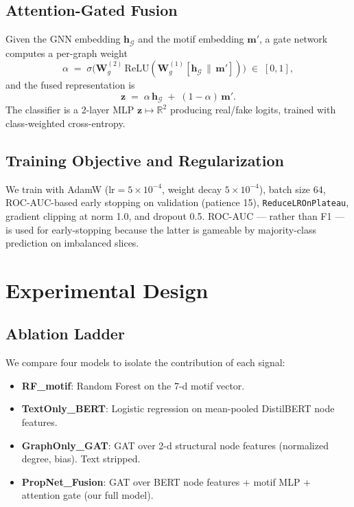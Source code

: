 \documentclass[conference]{IEEEtran}
\begin{document}
\subsection{Attention-Gated Fusion}
Given the GNN embedding $\mathbf{h}_{\mathcal{G}}$ and the motif embedding $\mathbf{m}'$, a gate network computes a per-graph weight
\begin{equation}
\alpha \;=\; \sigma\!\big(\mathbf{W}_g^{(2)} \,\mathrm{ReLU}(\mathbf{W}_g^{(1)} [\mathbf{h}_{\mathcal{G}} \,\|\, \mathbf{m}']) \big) \;\in\; [0,1],
\label{eq:gate}
\end{equation}
and the fused representation is
\begin{equation}
\mathbf{z} \;=\; \alpha \, \mathbf{h}_{\mathcal{G}} \;+\; (1-\alpha)\, \mathbf{m}'.
\label{eq:fuse}
\end{equation}
The classifier is a 2-layer MLP $\mathbf{z} \mapsto \mathbb{R}^{2}$ producing real/fake logits, trained with class-weighted cross-entropy.

\subsection{Training Objective and Regularization}
We train with AdamW ($\text{lr}{=}5\!\times\!10^{-4}$, weight decay $5\!\times\!10^{-4}$), batch size 64, ROC-AUC-based early stopping on validation (patience 15), \texttt{ReduceLROnPlateau}, gradient clipping at norm 1.0, and dropout 0.5. ROC-AUC --- rather than F1 --- is used for early-stopping because the latter is gameable by majority-class prediction on imbalanced slices.

\section{Experimental Design}

\subsection{Ablation Ladder}
We compare four models to isolate the contribution of each signal:
\begin{itemize}
\item \textbf{RF\_motif}: Random Forest on the 7-d motif vector.
\item \textbf{TextOnly\_BERT}: Logistic regression on mean-pooled DistilBERT node features.
\item \textbf{GraphOnly\_GAT}: GAT over 2-d structural node features (normalized degree, bias). Text stripped.
\item \textbf{PropNet\_Fusion}: GAT over BERT node features + motif MLP + attention gate (our full model).
\end{itemize}
\end{document}
